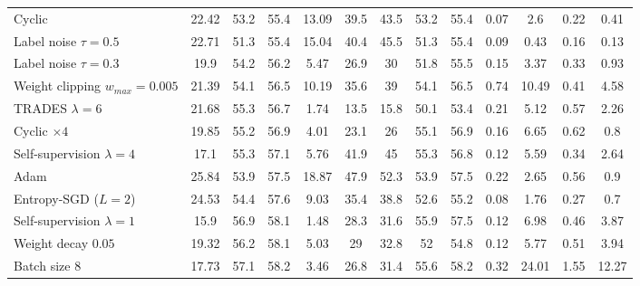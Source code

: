 \begin{table}[t]
{\begin{tabularx}{\textwidth}{|X|c|c|c||c|c|c||c|c||c|c|c|c|}
		\rowcolor{colorbrewer3!15}\hspace*{2px} Cyclic & 22.42 & 53.2 & 55.4 & 13.09 & 39.5 & 43.5 & 53.2 & 55.4 & 0.07 & 2.6 & 0.22 & 0.41\\
		\rowcolor{colorbrewer3!15}\hspace*{2px} Label noise $\tau{=}0.5$ & 22.71 & 51.3 & 55.4 & 15.04 & 40.4 & 45.5 & 51.3 & 55.4 & 0.09 & 0.43 & 0.16 & 0.13\\
		\rowcolor{colorbrewer3!15}\hspace*{2px} Label noise $\tau{=}0.3$ & 19.9 & 54.2 & 56.2 & 5.47 & 26.9 & 30 & 51.8 & 55.5 & 0.15 & 3.37 & 0.33 & 0.93\\
		\rowcolor{colorbrewer3!15}\hspace*{2px} Weight clipping $w_{max}{=}0.005$ & 21.39 & 54.1 & 56.5 & 10.19 & 35.6 & 39 & 54.1 & 56.5 & 0.74 & 10.49 & 0.41 & 4.58\\
		\rowcolor{colorbrewer3!15}\hspace*{2px} TRADES $\lambda{=}6$ & 21.68 & 55.3 & 56.7 & 1.74 & 13.5 & 15.8 & 50.1 & 53.4 & 0.21 & 5.12 & 0.57 & 2.26\\
		\rowcolor{colorbrewer3!15}\hspace*{2px} Cyclic $\times4$ & 19.85 & 55.2 & 56.9 & 4.01 & 23.1 & 26 & 55.1 & 56.9 & 0.16 & 6.65 & 0.62 & 0.8\\
		\hline
		\rowcolor{colorbrewer5!15}\hspace*{2px} Self-supervision $\lambda{=}4$ & 17.1 & 55.3 & 57.1 & 5.76 & 41.9 & 45 & 55.3 & 56.8 & 0.12 & 5.59 & 0.34 & 2.64\\
		\rowcolor{colorbrewer5!15}\hspace*{2px} Adam & 25.84 & 53.9 & 57.5 & 18.87 & 47.9 & 52.3 & 53.9 & 57.5 & 0.22 & 2.65 & 0.56 & 0.9\\
		\rowcolor{colorbrewer5!15}\hspace*{2px} Entropy-SGD ($L{=}2$) & 24.53 & 54.4 & 57.6 & 9.03 & 35.4 & 38.8 & 52.6 & 55.2 & 0.08 & 1.76 & 0.27 & 0.7\\
		\rowcolor{colorbrewer5!15}\hspace*{2px} Self-supervision $\lambda{=}1$ & 15.9 & 56.9 & 58.1 & 1.48 & 28.3 & 31.6 & 55.9 & 57.5 & 0.12 & 6.98 & 0.46 & 3.87\\
		\rowcolor{colorbrewer5!15}\hspace*{2px} Weight decay $0.05$ & 19.32 & 56.2 & 58.1 & 5.03 & 29 & 32.8 & 52 & 54.8 & 0.12 & 5.77 & 0.51 & 3.94\\
		\rowcolor{colorbrewer5!15}\hspace*{2px} Batch size $8$ & 17.73 & 57.1 & 58.2 & 3.46 & 26.8 & 31.4 & 55.6 & 58.2 & 0.32 & 24.01 & 1.55 & 12.27\\

\end{tabularx}}
\end{table}
